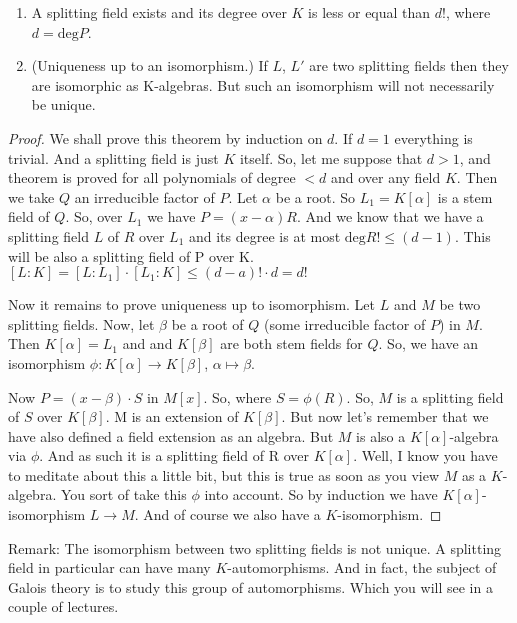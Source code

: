 \begin{theorem}
\begin{enumerate}
\item A splitting field exists and its degree over $K$ is less or equal than $d!$, where $d=\text{deg}P$.
\item (Uniqueness up to an isomorphism.) If $L$, $L'$ are two splitting fields then they are isomorphic as K-algebras. But such an isomorphism will not necessarily be unique.
\end{enumerate}
\end{theorem}

\begin{proof}
We shall prove this theorem by induction on $d$. If $d=1$ everything is trivial. And a splitting field is just $K$ itself. So, let me suppose that $d>1$, and theorem is proved for all polynomials of degree $<d$ and over any field $K$. Then we take $Q$ an irreducible factor of $P$. Let $\alpha$ be a root. So $L_1=K[\alpha]$ is a stem field of $Q$. So, over $L_1$ we have $P=(x - \alpha)R$. And we know that we have a splitting field $L$ of $R$ over $L_1$ and its degree is at most $\text{deg}R!\leq (d-1)$. This will be also a splitting field of P over K. $[L:K] = [L:L_1]\cdot[L_1:K]\leq (d-a)! \cdot d= d!$ 

Now it remains to prove uniqueness up to isomorphism. Let $L$ and $M$ be two splitting fields. Now, let $\beta$ be a root of $Q$ (some irreducible factor of $P$) in $M$.  Then $K[\alpha]=L_1$ and and $K[\beta]$ are both stem fields for $Q$. So, we have an isomorphism $\phi: K[\alpha] \to K[\beta]$, $\alpha \mapsto \beta$.

Now $P=(x-\beta) \cdot S$ in $M[x]$. So, where $S=\phi(R)$. So, $M$ is a splitting field of $S$ over $K[\beta]$. M is an extension of $K[\beta]$. But now let's remember that we have also defined a field extension as an algebra. But $M$ is also a $K[\alpha]$-algebra via $\phi$. And as such it is a splitting field of R over $K[\alpha]$. Well, I know you have to meditate about this a little bit, but this is true as soon as you view $M$ as a $K$-algebra. You sort of take this $\phi$ into account. So by induction we have $K[\alpha]$-isomorphism $L \to M$. And of course we also have a $K$-isomorphism. 
\end{proof}

Remark: The isomorphism between two splitting fields is not unique. A splitting field in particular can have many $K$-automorphisms. And in fact, the subject of Galois theory is to study this group of automorphisms. Which you will see in a couple of lectures.


